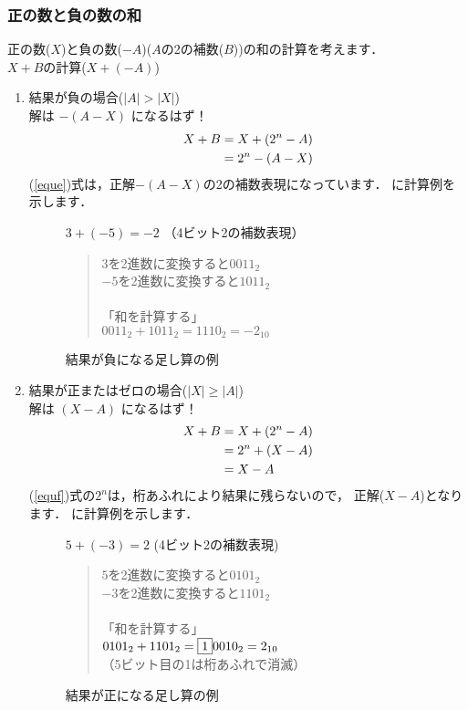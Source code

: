 \subsubsection{正の数と負の数の和}
正の数($X$)と負の数($-A$)($A$の2の補数($B$))の和の計算を考えます．\\
$X + B$の計算($X + (-A)$)
\begin{enumerate}
\item 結果が負の場合($|A| > |X|$)\\
解は $-(A - X)$ になるはず！
{\small\begin{align}
X + B &= X + (2^n - A) \notag \\
      &= 2^n - (A - X) \label{eque}
\end{align}}
(\ref{eque})式は，正解$-(A - X)$の2の補数表現になっています．
に計算例を示します．

\begin{figure}[tbp]
\begin{center}
\parbox{0.9\columnwidth}{\small
$3+(-5)=-2$ （4ビット2の補数表現） \\
\begin{quote}
$3$を2進数に変換すると$0011_2$ \\
$-5$を2進数に変換すると$1011_2$ \\
\\
「和を計算する」 \\
$0011_2+1011_2=1110_2= -2_{10}$ \\
\end{quote}}
\caption{結果が負になる足し算の例}
\label{fig:chap2:addex1}
\end{center}
\end{figure}

\item 結果が正またはゼロの場合($|X| \geq |A|$)\\
解は $(X - A)$ になるはず！
{\small\begin{align}
X + B &= X + (2^n - A) \notag \\
      &= 2^n + (X - A) \label{equf} \\
      &= X - A         \notag
\end{align}}
(\ref{equf})式の$2^n$は，桁あふれにより結果に残らないので，
正解($X - A$)となります．
に計算例を示します．

\begin{figure}[tbp]
\begin{center}
\parbox{0.9\columnwidth}{\small
$5+(-3)=2$ (4ビット2の補数表現)\\
\begin{quote}
$5$を2進数に変換すると$0101_2$ \\
$-3$を2進数に変換すると$1101_2$ \\
\\
「和を計算する」 \\
$0101_2 + 1101_2 = \fbox{1}0010_2 =  2_{10}$ \\
（5ビット目の1は桁あふれで消滅）
\end{quote}}
\caption{結果が正になる足し算の例}
\label{fig:chap2:addex2}
\end{center}
\end{figure}
\end{enumerate}


